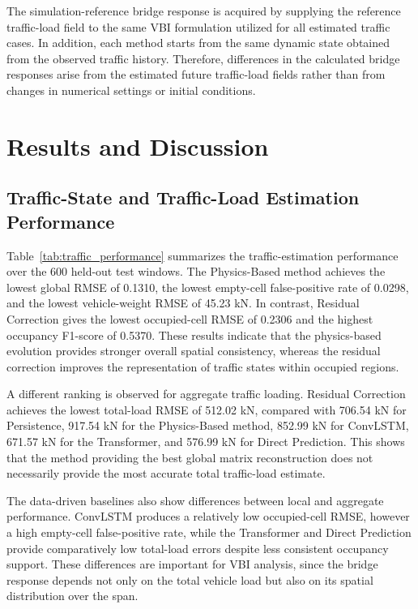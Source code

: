 \documentclass[journal]{IEEEtran}
\begin{document}
The simulation-reference bridge response is acquired by supplying the reference traffic-load field to the same VBI formulation utilized for all estimated traffic cases. In addition, each method starts from the same dynamic state obtained from the observed traffic history. Therefore, differences in the calculated bridge responses arise from the estimated future traffic-load fields rather than from changes in numerical settings or initial conditions.

\section{Results and Discussion}
\subsection{Traffic-State and Traffic-Load Estimation Performance}
\label{sec:traffic_results}

Table~\ref{tab:traffic_performance} summarizes the traffic-estimation performance over the 600 held-out test windows. The Physics-Based method achieves the lowest global RMSE of 0.1310, the lowest empty-cell false-positive rate of 0.0298, and the lowest vehicle-weight RMSE of 45.23 kN. In contrast, Residual Correction gives the lowest occupied-cell RMSE of 0.2306 and the highest occupancy F1-score of 0.5370. These results indicate that the physics-based evolution provides stronger overall spatial consistency, whereas the residual correction improves the representation of traffic states within occupied regions.

A different ranking is observed for aggregate traffic loading. Residual Correction achieves the lowest total-load RMSE of 512.02 kN, compared with 706.54 kN for Persistence, 917.54 kN for the Physics-Based method, 852.99 kN for ConvLSTM, 671.57 kN for the Transformer, and 576.99 kN for Direct Prediction. This shows that the method providing the best global matrix reconstruction does not necessarily provide the most accurate total traffic-load estimate.

The data-driven baselines also show differences between local and aggregate performance. ConvLSTM produces a relatively low occupied-cell RMSE, however a high empty-cell false-positive rate, while the Transformer and Direct Prediction provide comparatively low total-load errors despite less consistent occupancy support. These differences are important for VBI analysis, since the bridge response depends not only on the total vehicle load but also on its spatial distribution over the span.
\end{document}
